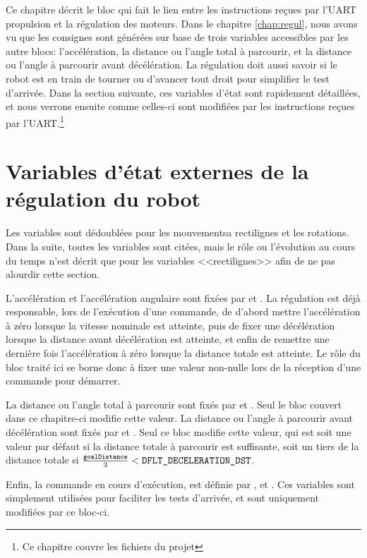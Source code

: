 Ce chapitre décrit le bloc qui fait le lien entre les instructions reçues par l'UART propulsion et la régulation des moteurs. Dans le chapitre \ref{chap:regul}, nous avons vu que les consignes sont générées sur base de trois variables accessibles par les autre blocs: l'accélération, la distance ou l'angle total à parcourir, et la distance ou l'angle à parcourir avant décélération. La régulation doit aussi savoir si le robot est en train de tourner ou d'avancer tout droit pour simplifier le test d'arrivée. Dans la section suivante, ces variables d'état sont rapidement détaillées, et nous verrons ensuite comme celles-ci sont modifiées par les instructions reçues par l'UART.\footnote{Ce chapitre couvre les fichiers  du projet }

\section{Variables d'état externes de la régulation du robot\label{sec:stateVars}}
Les variables sont dédoublées pour les mouvementsa rectilignes et les rotations. Dans la suite, toutes les variables sont citées, mais le rôle ou l'évolution au cours du temps n'est décrit que pour les variables <<rectilignes>> afin de ne pas alourdir cette section.

L'accélération et l'accélération angulaire sont fixées par  et . La régulation est déjà responsable, lors de l'exécution d'une commande, de d'abord mettre l'accélération à zéro lorsque la vitesse nominale est atteinte, puis de fixer une décélération lorsque la distance avant décélération est atteinte, et enfin de remettre une dernière fois l'accélération à zéro lorsque la distance totale est atteinte. Le rôle du bloc traité ici se borne donc à fixer une valeur non-nulle lors de la réception d'une commande pour démarrer.

La distance ou l'angle total à parcourir sont fixés par  et . Seul le bloc couvert dans ce chapitre-ci modifie cette valeur. La distance ou l'angle à parcourir avant décélération sont fixés par  et . Seul ce bloc modifie cette valeur, qui est soit une valeur par défaut si la distance totale à parcourir est suffisante, soit un tiers de la distance totale si $\frac{\text{\texttt{goalDistance}}}{3}<\text{\texttt{DFLT\_DECELERATION\_DST}}$.

Enfin, la commande en cours d'exécution, est définie par , et . Ces variables sont simplement utilisées pour faciliter les tests d'arrivée, et sont uniquement modifiées par ce bloc-ci.

